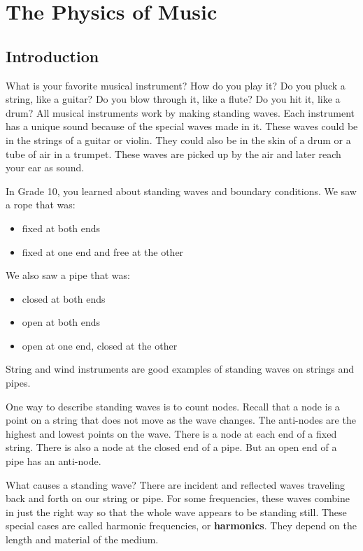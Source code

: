 \chapter{The Physics of Music}
\label{p:wsl:pm11}


\section{Introduction}
What is your favorite musical instrument? How do you play it? Do you pluck a string, like a guitar?
Do you blow through it, like a flute? Do you hit it, like a drum?
All musical instruments work by making standing waves. Each instrument has a unique sound because of the special waves made in it.
These waves could be in the strings of a guitar or violin.
They could also be in the skin of a drum or a tube of air in a trumpet.
These waves are picked up by the air and later reach your ear as sound.

In Grade 10, you learned about standing waves and boundary conditions. We saw a rope that was:
\begin{itemize}
\item{fixed at both ends}
\item{fixed at one end and free at the other}
\end{itemize}



We also saw a pipe that was:
\begin{itemize}
\item{closed at both ends}
\item{open at both ends}
\item{open at one end, closed at the other}
\end{itemize}

String and wind instruments are good examples of standing waves on strings and pipes.

One way to describe standing waves is to count nodes.
Recall that a node is a point on a string that does not move as the wave changes.
The anti-nodes are the highest and lowest points on the wave. There is a node at each end of a fixed string.
There is also a node at the closed end of a pipe.
But an open end of a pipe has an anti-node.

What causes a standing wave? There are incident and reflected waves traveling back and forth on our string or pipe.
For some frequencies, these waves combine in just the right way so that the whole wave appears to be standing still.
These special cases are called harmonic frequencies, or \textbf{harmonics}.
They depend on the length and material of the medium.

